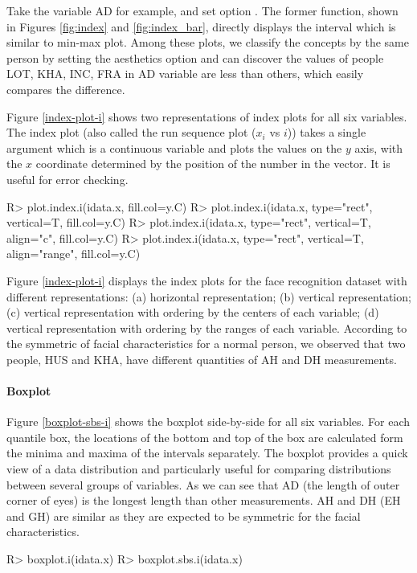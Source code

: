 \documentclass[article]{jss}
\begin{document}
Take the variable AD for example, and set option . The former function, shown in Figures \ref{fig:index} and \ref{fig:index_bar}, directly displays the interval which is similar to min-max plot. Among these plots, we classify the concepts by the same person by setting the aesthetics option  and can discover the values of people LOT, KHA, INC, FRA in AD variable are less than others, which easily compares the difference. 


Figure \ref{index-plot-i} shows two representations 
of index plots for all six variables. The index plot (also
called the run sequence plot ($x_i$ vs $i$)) takes a single
argument which is a continuous variable and plots the
values on the $y$ axis, with the $x$ coordinate determined
by the position of the number in the vector. It is useful
for error checking. 
\begin{CodeChunk}
\begin{CodeInput}
R> plot.index.i(idata.x, fill.col=y.C)
R> plot.index.i(idata.x, type="rect", vertical=T, fill.col=y.C)
R> plot.index.i(idata.x, type="rect", vertical=T, align="c", fill.col=y.C)
R> plot.index.i(idata.x, type="rect", vertical=T, align="range", fill.col=y.C)
\end{CodeInput}
\end{CodeChunk}
Figure \ref{index-plot-i} displays the index plots for the face recognition 
dataset with different representations: (a) horizontal representation; (b) 
vertical representation; (c) vertical representation with 
ordering by the centers of each variable; (d) vertical representation with 
ordering by the ranges of each variable. According to the symmetric of facial
characteristics for a normal person, we observed that two
people, HUS and KHA, have different quantities of AH and DH
measurements.

\paragraph{Boxplot} Figure \ref{boxplot-sbs-i} shows
the boxplot side-by-side for all six variables. For each
quantile box, the locations of the bottom and top of the
box are calculated form the minima and maxima of
the intervals separately. The boxplot provides a quick view of
a data distribution and particularly useful for comparing
distributions between several groups of variables. As we
can see that AD (the length of outer corner of eyes) is the
longest length than other measurements. AH and DH (EH and
GH) are similar as they are expected to be symmetric for the facial
characteristics.
\begin{CodeChunk}
\begin{CodeInput}
R> boxplot.i(idata.x)
R> boxplot.sbs.i(idata.x)
\end{CodeInput}
\end{CodeChunk}
\end{document}

